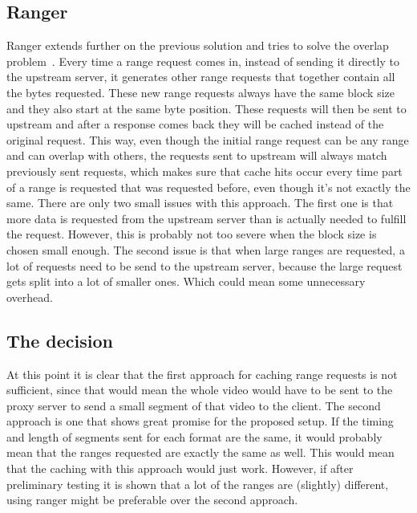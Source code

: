 \documentclass[twoside,openright]{uva-bachelor-thesis}
\begin{document}
\subsection{Ranger}
Ranger extends further on the previous solution and tries to solve the overlap
problem~\autocite{ranger}. Every time a range request comes in, instead of
sending it directly to the upstream server, it generates other range requests
that together contain all the bytes requested. These new range requests always
have the same block size and they also start at the same byte position.  These
requests will then be sent to upstream and after a response comes back they will
be cached instead of the original request.  This way, even though the initial
range request can be any range and can overlap with others, the requests sent to
upstream will always match previously sent requests, which makes sure that cache
hits occur every time part of a range is requested that was requested before,
even though it's not exactly the same. There are only two small issues with this
approach.  The first one is that more data is requested from the upstream server
than is actually needed to fulfill the request. However, this is probably not
too severe when the block size is chosen small enough. The second issue is that
when large ranges are requested, a lot of requests need to be send to the
upstream server, because the large request gets split into a lot of smaller
ones. Which could mean some unnecessary overhead.

\subsection{The decision}
At this point it is clear that the first approach for caching range requests is
not sufficient, since that would mean the whole video would have to be sent to
the proxy server to send a small segment of that video to the client. The second
approach is one that shows great promise for the proposed setup. If the timing
and length of segments sent for each format are the same, it would probably mean
that the ranges requested are exactly the same as well. This would mean that the
caching with this approach would just work. However, if after preliminary
testing it is shown that a lot of the ranges are (slightly) different, using
ranger might be preferable over the second approach.
\end{document}
